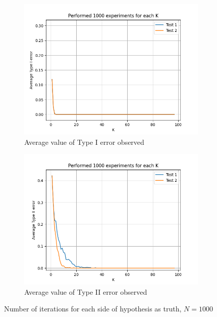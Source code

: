 \documentclass[fleqn, 11pt]{article}
\begin{document}
\newpage
\begin{figure}[H]
    \centering
    \begin{subfigure}[H]{0.49\textwidth}
        \centering
        \includegraphics[width=\textwidth]{P3/type1_1000.png}
        \caption[]{Average value of Type I error observed}
    \end{subfigure}
    \begin{subfigure}[H]{0.49\textwidth}
        \centering
        \includegraphics[width=\textwidth]{P3/type2_1000.png}
        \caption[]{Average value of Type II error observed}
    \end{subfigure}
    \caption{Number of iterations for each side of hypothesis as truth, $N = 1000$}
\end{figure}
\end{document}
